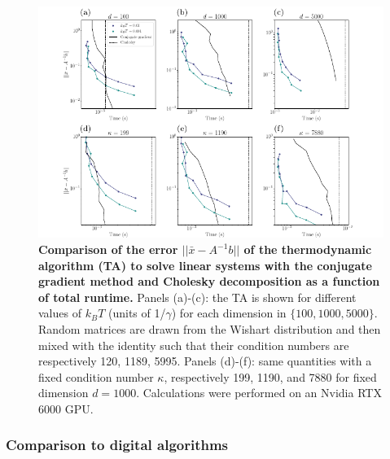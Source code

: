 \documentclass[prx,onecolumn,floatfix,longbibliography,notitlepage, nofootinbib,12pt]{revtex4-2}
\begin{document}
\begin{figure}[t]
   \centering
\includegraphics[width=\linewidth]{figures/error_vs_time_linearsys.pdf}
   \caption{\textbf{Comparison of the error $||\bar{x} - A^{-1}b||$ of the thermodynamic algorithm (TA) to solve linear systems with the conjugate gradient method and Cholesky decomposition as a function of total runtime.} Panels (a)-(c): the TA is shown for different values of $k_BT$ (units of 1/$\gamma$) for each dimension in $\{100, 1000, 5000\}$. Random matrices are drawn from the Wishart distribution and then mixed with the identity such that their condition numbers are respectively 120, 1189, 5995. Panels (d)-(f): same quantities with a fixed condition number $\kappa$, respectively 199, 1190, and 7880 for fixed dimension $d = 1000$. Calculations were performed on an Nvidia RTX 6000 GPU.}
    \label{fig:linearsys_comparison_d}
\end{figure}



\subsubsection{Comparison to digital algorithms}
\end{document}

